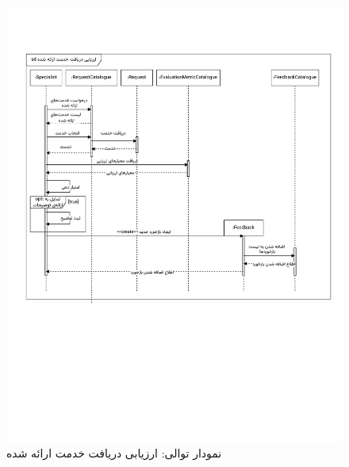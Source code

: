\begin{figure}[ht!]
	\centering
	\includegraphics[scale=0.8, page=1]{figs/OOD-Sequence-3.pdf}
	\caption{نمودار توالی: ارزیابی دریافت خدمت ارائه شده}
\end{figure}
\FloatBarrier
\newpage

